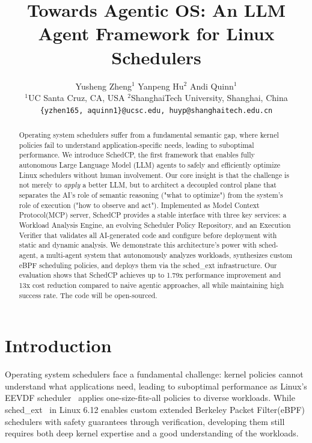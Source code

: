 \documentclass[preprint]{article}
\title{Towards Agentic OS: An LLM Agent Framework for Linux Schedulers}
\author{%
  Yusheng Zheng$^{1}$ \quad
  Yanpeng Hu$^{2}$ \quad
  Andi Quinn$^{1}$ \\
  $^{1}$UC Santa Cruz, CA, USA \quad
  $^{2}$ShanghaiTech University, Shanghai, China \\
  \texttt{\{yzhen165, aquinn1\}@ucsc.edu, huyp@shanghaitech.edu.cn}
}
\newcommand{\sys}{SchedCP\xspace}
\newcommand{\agent}{sched-agent\xspace}
\begin{document}
\maketitle


\begin{abstract}
Operating system schedulers suffer from a fundamental semantic gap, where kernel policies fail to understand application-specific needs, leading to suboptimal performance. We introduce \sys, the first framework that enables fully autonomous Large Language Model (LLM) agents to safely and efficiently optimize Linux schedulers without human involvement. Our core insight is that the challenge is not merely to \emph{apply} a better LLM, but to architect a decoupled control plane that separates the AI's role of semantic reasoning ("what to optimize") from the system's role of execution ("how to observe and act"). Implemented as Model Context Protocol(MCP) server, \sys provides a stable interface with three key services: a Workload Analysis Engine, an evolving Scheduler Policy Repository, and an Execution Verifier that validates all AI-generated code and configure before deployment with static and dynamic analysis. We demonstrate this architecture's power with \agent, a multi-agent system that autonomously analyzes workloads, synthesizes custom eBPF scheduling policies, and deploys them via the sched\_ext infrastructure. Our evaluation shows that SchedCP achieves up to 1.79x performance improvement and 13x cost reduction compared to naive agentic approaches, all while maintaining high success rate. The code will be open-sourced.
\end{abstract}



\maketitle
\section{Introduction}
\label{sec:intro}

Operating system schedulers face a fundamental challenge: kernel policies cannot understand what applications need, leading to suboptimal performance as Linux's EEVDF scheduler~\cite{eevdf2024} applies one-size-fits-all policies to diverse workloads. While sched\_ext~\cite{schedext2024} in Linux 6.12 enables custom extended Berkeley Packet Filter(eBPF) schedulers with safety guarantees through verification, developing them still requires both deep kernel expertise and a good understanding of the workloads.
\end{document}
